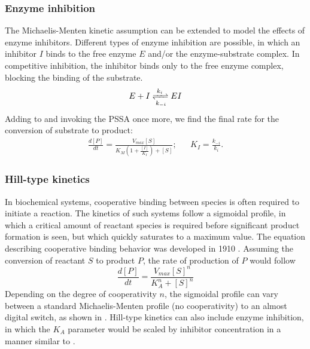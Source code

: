 \subsubsection{Enzyme inhibition}
The Michaelis-Menten kinetic assumption can be extended to model the effects of enzyme inhibitors.
Different types of enzyme inhibition are possible, in which an inhibitor $I$ binds to the free enzyme $E$ and/or the enzyme-substrate complex.
In competitive inhibition, the inhibitor binds only to the free enzyme complex, blocking the binding of the substrate.
\begin{equation}
  E + I \xrightleftharpoons[k_{-i}]{k_{i}} EI
  \label{eq:compinh}
\end{equation}
Adding  to  and invoking the PSSA once more, we find the final rate for the conversion of substrate to product:
\begin{align}
  \frac{d[P]}{dt} = \frac{V_{max}[S]}{K_M\left(1 + \frac{[I]}{K_I}\right) + [S]}; & & K_I = \frac{k_{-i}}{k_i}.\label{eq:inheq}
\end{align}

\subsubsection{Hill-type kinetics}

In biochemical systems, cooperative binding between species is often required to initiate a reaction. 
The kinetics of such systems follow a sigmoidal profile, in which a critical amount of reactant species is required before significant product formation is seen, but which quickly saturates to a maximum value. 
The equation describing cooperative binding behavior was developed in 1910 \cite{Hill1910}. Assuming the conversion of reactant $S$ to product $P$, the rate of production of $P$ would follow
\begin{equation}
  \frac{d[P]}{dt} = \frac{V_{max} [S]^n}{K_A^n + [S]^n}
  \label{eq:hill}
\end{equation}
Depending on the degree of cooperativity $n$, the sigmoidal profile can vary between a standard Michaelis-Menten profile (no cooperativity) to an almost digital switch, as shown in .
Hill-type kinetics can also include enzyme inhibition, in which the $K_A$ parameter would be scaled by inhibitor concentration in a manner similar to .

